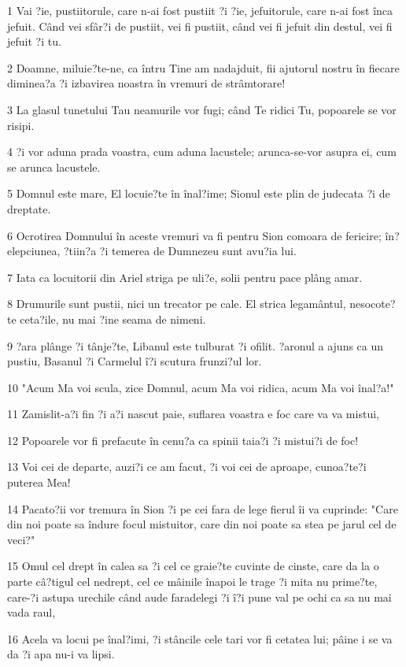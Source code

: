 \par 1 Vai ?ie, pustiitorule, care n-ai fost pustiit ?i ?ie, jefuitorule, care n-ai fost înca jefuit. Când vei sfâr?i de pustiit, vei fi pustiit, când vei fi jefuit din destul, vei fi jefuit ?i tu.
\par 2 Doamne, miluie?te-ne, ca întru Tine am nadajduit, fii ajutorul nostru în fiecare diminea?a ?i izbavirea noastra în vremuri de strâmtorare!
\par 3 La glasul tunetului Tau neamurile vor fugi; când Te ridici Tu, popoarele se vor risipi.
\par 4 ?i vor aduna prada voastra, cum aduna lacustele; arunca-se-vor asupra ei, cum se arunca lacustele.
\par 5 Domnul este mare, El locuie?te în înal?ime; Sionul este plin de judecata ?i de dreptate.
\par 6 Ocrotirea Domnului în aceste vremuri va fi pentru Sion comoara de fericire; în?elepciunea, ?tiin?a ?i temerea de Dumnezeu sunt avu?ia lui.
\par 7 Iata ca locuitorii din Ariel striga pe uli?e, solii pentru pace plâng amar.
\par 8 Drumurile sunt pustii, nici un trecator pe cale. El strica legamântul, nesocote?te ceta?ile, nu mai ?ine seama de nimeni.
\par 9 ?ara plânge ?i tânje?te, Libanul este tulburat ?i ofilit. ?aronul a ajuns ca un pustiu, Basanul ?i Carmelul î?i scutura frunzi?ul lor.
\par 10 "Acum Ma voi scula, zice Domnul, acum Ma voi ridica, acum Ma voi înal?a!"
\par 11 Zamislit-a?i fin ?i a?i nascut paie, suflarea voastra e foc care va va mistui,
\par 12 Popoarele vor fi prefacute în cenu?a ca spinii taia?i ?i mistui?i de foc!
\par 13 Voi cei de departe, auzi?i ce am facut, ?i voi cei de aproape, cunoa?te?i puterea Mea!
\par 14 Pacato?ii vor tremura în Sion ?i pe cei fara de lege fierul îi va cuprinde: "Care din noi poate sa îndure focul mistuitor, care din noi poate sa stea pe jarul cel de veci?"
\par 15 Omul cel drept în calea sa ?i cel ce graie?te cuvinte de cinste, care da la o parte câ?tigul cel nedrept, cel ce mâinile înapoi le trage ?i mita nu prime?te, care-?i astupa urechile când aude faradelegi ?i î?i pune val pe ochi ca sa nu mai vada raul,
\par 16 Acela va locui pe înal?imi, ?i stâncile cele tari vor fi cetatea lui; pâine i se va da ?i apa nu-i va lipsi.
